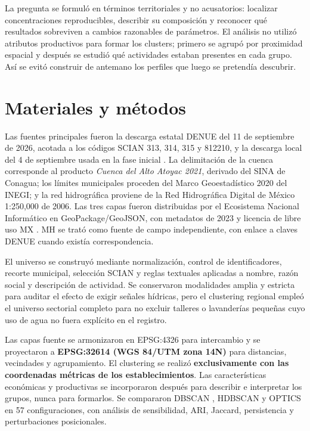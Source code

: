 \documentclass[11pt,letterpaper]{article}
\begin{document}
La pregunta se formuló en términos territoriales y no acusatorios: localizar concentraciones reproducibles, describir su composición y reconocer qué resultados sobreviven a cambios razonables de parámetros. El análisis no utilizó atributos productivos para formar los clusters; primero se agrupó por proximidad espacial y después se estudió qué actividades estaban presentes en cada grupo. Así se evitó construir de antemano los perfiles que luego se pretendía descubrir.

\section{Materiales y métodos}

Las fuentes principales fueron la descarga estatal DENUE del 11 de septiembre de 2026, acotada a los códigos SCIAN 313, 314, 315 y 812210, y la descarga local del 4 de septiembre usada en la fase inicial \cite{inegi2026denue}. La delimitación de la cuenca corresponde al producto \emph{Cuenca del Alto Atoyac 2021}, derivado del SINA de Conagua; los límites municipales proceden del Marco Geoestadístico 2020 del INEGI; y la red hidrográfica proviene de la Red Hidrográfica Digital de México 1:250,000 de 2006. Las tres capas fueron distribuidas por el Ecosistema Nacional Informático en GeoPackage/GeoJSON, con metadatos de 2023 y licencia de libre uso MX \cite{eni2023cuenca,eni2023municipios,eni2023red}. MH se trató como fuente de campo independiente, con enlace a claves DENUE cuando existía correspondencia.

El universo se construyó mediante normalización, control de identificadores, recorte municipal, selección SCIAN y reglas textuales aplicadas a nombre, razón social y descripción de actividad. Se conservaron modalidades amplia y estricta para auditar el efecto de exigir señales hídricas, pero el clustering regional empleó el universo sectorial completo para no excluir talleres o lavanderías pequeñas cuyo uso de agua no fuera explícito en el registro.

Las capas fuente se armonizaron en EPSG:4326 para intercambio y se proyectaron a \textbf{EPSG:32614 (WGS 84/UTM zona 14N)} para distancias, vecindades y agrupamiento. El clustering se realizó \textbf{exclusivamente con las coordenadas métricas de los establecimientos}. Las características económicas y productivas se incorporaron después para describir e interpretar los grupos, nunca para formarlos. Se compararon DBSCAN \cite{ester1996dbscan}, HDBSCAN \cite{campello2013hdbscan} y OPTICS \cite{ankerst1999optics} en 57 configuraciones, con análisis de sensibilidad, ARI, Jaccard, persistencia y perturbaciones posicionales.
\end{document}
